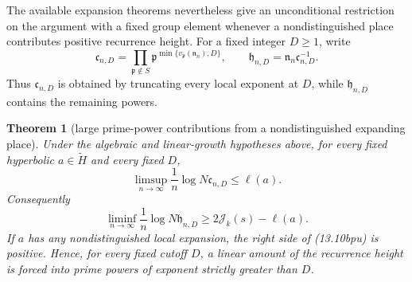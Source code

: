 \documentclass[11pt,reqno]{amsart}
\newtheorem{theorem}{Theorem}[section]
\theoremstyle{definition}
\theoremstyle{remark}
\begin{document}
The available expansion theorems nevertheless give an unconditional
restriction on the argument with a fixed group element whenever a
nondistinguished place contributes positive recurrence height.  For a fixed
integer \(D\ge1\),
write
\[
 \mathfrak c_{n,D}
 =\prod_{\mathfrak p\notin S}
   \mathfrak p^{\min\{v_{\mathfrak p}(\mathfrak n_n),D\}},
 \qquad
 \mathfrak h_{n,D}=\mathfrak n_n\mathfrak c_{n,D}^{-1}.
\tag{13.10bps}
\]
Thus \(\mathfrak c_{n,D}\) is obtained by truncating every local exponent at
\(D\), while \(\mathfrak h_{n,D}\) contains the remaining powers.

\begin{theorem}[large prime-power contributions from a nondistinguished expanding place]
\label{thm:high-power-concentration}
Under the algebraic and linear-growth hypotheses above, for every fixed
hyperbolic \(a\in\widetilde H\) and every fixed \(D\),
\[
 \limsup_{n\to\infty}\frac1n\log N\mathfrak c_{n,D}
 \le \ell(a).
\tag{13.10bpt}
\]
Consequently
\[
 \liminf_{n\to\infty}\frac1n\log N\mathfrak h_{n,D}
 \ge 2\mathcal J_k(s)-\ell(a).
\tag{13.10bpu}
\]
If \(a\) has any nondistinguished local expansion, the right side of
(13.10bpu) is positive.  Hence, for every fixed cutoff \(D\), a linear
amount of the recurrence height is forced into prime powers of exponent
strictly greater than \(D\).
\end{theorem}
\end{document}
